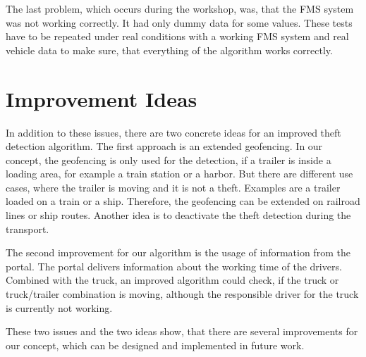 The last problem, which occurs during the workshop, was, that the FMS system was not working correctly. It had only dummy data for some values. These tests have to be repeated under real conditions with a working FMS system and real vehicle data to make sure, that everything of the algorithm works correctly.

\section{Improvement Ideas}

In addition to these issues, there are two concrete ideas for an improved theft detection algorithm. The first approach is an extended geofencing. In our concept, the geofencing is only used for the detection, if a trailer is inside a loading area, for example a train station or a harbor. But there are different use cases, where the trailer is moving and it is not a theft. Examples are a trailer loaded on a train or a ship. Therefore, the geofencing can be extended on railroad lines or ship routes. Another idea is to deactivate the theft detection during the transport.

The second improvement for our algorithm is the usage of information from the portal. The portal delivers information about the working time of the drivers. Combined with the truck, an improved algorithm could check, if the truck or truck/trailer combination is moving, although the responsible driver for the truck is currently not working. 

These two issues and the two ideas show, that there are several improvements for our concept, which can be designed and implemented in future work.

\clearpage